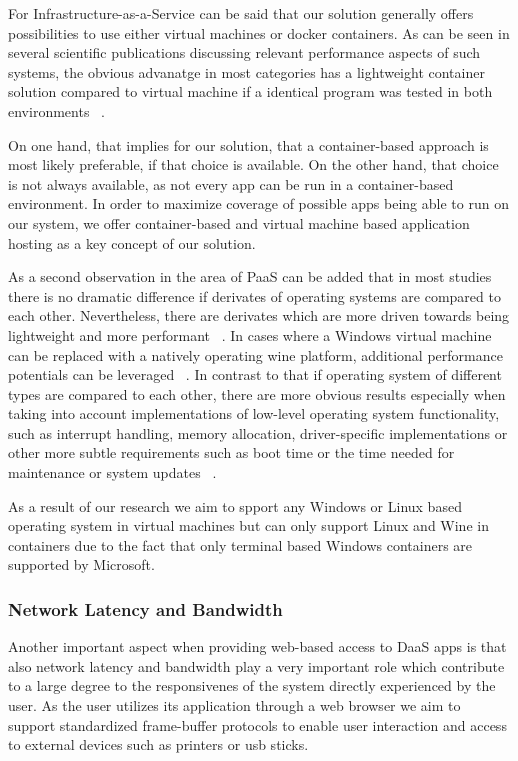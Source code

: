 \documentclass[runningheads]{llncs}
\begin{document}
For Infrastructure-as-a-Service can be said
that our solution generally offers possibilities
to use either virtual machines or docker containers.
As can be seen in several scientific publications
discussing relevant performance aspects of such systems,
the obvious advanatge in most categories
has a lightweight container solution compared to virtual machine
if a identical program was tested in both environments
~\cite{felter2015updated,potdar2020performance,seo2014performance}.

On one hand, that implies for our solution,
that a container-based approach is most likely preferable,
if that choice is available.
On the other hand, that  choice is not always available,
as not every app can be run in a container-based environment.
In order to maximize coverage of possible apps being able to run on our system,
we offer container-based and virtual machine based application hosting
as a key concept of our solution.

As a second observation in the area of PaaS can be added
that in most studies there is no dramatic difference
if derivates of operating systems are compared to each other.
Nevertheless, there are derivates
which are more driven towards being lightweight and more performant
~\cite{balen2020performance,boras2020performance}.  %
In cases where a Windows virtual machine can be replaced with a natively operating wine platform,
additional performance potentials can be leveraged
~\cite{huang2012performance}.  %
In contrast to that if operating system of different types are compared to each other,
there are more obvious results
especially when taking into account implementations of low-level operating system functionality,
such as interrupt handling, memory allocation, driver-specific implementations
or other more subtle requirements such as boot time
or the time needed for maintenance or system updates
~\cite{sergeev2022docker,sulaiman2021comparison}. %

As a result of our research we aim to spport
any Windows or Linux based operating system in virtual machines
but can only support Linux and Wine in containers
due to the fact that only terminal based Windows containers are supported by Microsoft.

\subsubsection{Network Latency and Bandwidth}
Another important aspect when providing web-based access to DaaS apps
is that also network latency and bandwidth play a very important role
which contribute to a large degree to the responsivenes of the system
directly experienced by the user.
As the user utilizes its application through a web browser
we aim to support standardized frame-buffer protocols
to enable user interaction and access to external devices such as printers or usb sticks.
\end{document}
